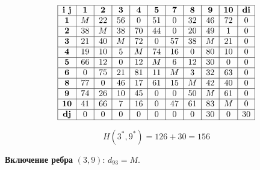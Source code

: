 \documentclass[17pt]{extarticle}
\begin{document}
\[
    \begin{array}{|c|c|c|c|c|c|c|c|c|c|c|}
        \hline
        \textbf{i j} & \textbf{1} & \textbf{2} & \textbf{3} & \textbf{4} & \textbf{5} & \textbf{7} & \textbf{8} & \textbf{9} & \textbf{10} & \textbf{di} \\
        \hline
        \textbf{1}   & M          & 22         & 56         & 0          & 51         & 0          & 32         & 46         & 72          & 0           \\
        \hline
        \textbf{2}   & 38         & M          & 38         & 70         & 44         & 0          & 20         & 49         & 1           & 0           \\
        \hline
        \textbf{3}   & 21         & 40         & M          & 72         & 0          & 57         & 38         & M          & 21          & 0           \\
        \hline
        \textbf{4}   & 19         & 10         & 5          & M          & 74         & 16         & 0          & 80         & 10          & 0           \\
        \hline
        \textbf{5}   & 66         & 12         & 0          & 12         & M          & 6          & 12         & 30         & 0           & 0           \\
        \hline
        \textbf{6}   & 0          & 75         & 21         & 81         & 11         & M          & 3          & 32         & 63          & 0           \\
        \hline
        \textbf{8}   & 77         & 0          & 46         & 17         & 61         & 15         & M          & 42         & 40          & 0           \\
        \hline
        \textbf{9}   & 74         & 26         & 10         & 45         & 0          & 0          & 50         & M          & 61          & 0           \\
        \hline
        \textbf{10}  & 41         & 66         & 7          & 16         & 0          & 47         & 61         & 83         & M           & 0           \\
        \hline
        \textbf{dj}  & 0          & 0          & 0          & 0          & 0          & 0          & 0          & 30         & 0           & 30          \\
        \hline
    \end{array}
\]

\[ H(3^*,9^*) = 126 + 30 = 156 \]

\textbf{Включение ребра} \((3,9)\): \( d_{93} = M \).
\end{document}
